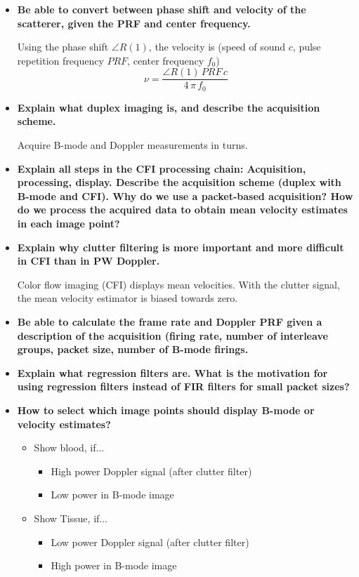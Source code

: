 \documentclass[10pt,a4paper,noendnumber=true]{scrartcl}
\begin{document}
\begin{itemize}
\item \textbf{Be able to convert between phase shift and velocity of the scatterer, given the PRF and center frequency.}

Using the phase shift $\angle R(1)$, the velocity is (speed of sound $c$, pulse repetition frequency $PRF$, center frequency $f_0$)
\begin{equation}
\nu = \frac{\angle R(1)\,PRF\,c}{4\,\pi\,f_0}
\end{equation}

\item \textbf{Explain what duplex imaging is, and describe the acquisition scheme.}

Acquire B-mode and Doppler measurements in turns.

\item \textbf{Explain all steps in the CFI processing chain: Acquisition, processing, display. Describe the acquisition scheme (duplex with B-mode and CFI). Why do we use a packet-based acquisition? How do we process the acquired data to obtain mean velocity estimates in each image point?}



\item \textbf{Explain why clutter filtering is more important and more difficult in CFI than in PW Doppler.}

Color flow imaging (CFI) displays mean velocities. With the clutter signal, the mean velocity estimator is biased towards zero.

\item \textbf{Be able to calculate the frame rate and Doppler PRF given a description of the acquisition (firing rate, number of interleave groups, packet size, number of B-mode firings.}



\item \textbf{Explain what regression filters are. What is the motivation for using regression filters instead of FIR filters for small packet sizes?}



\item \textbf{How to select which image points should display B-mode or velocity estimates?}

\begin{itemize}
\item Show blood, if...
\begin{itemize}
\item High power Doppler signal (after clutter filter)
\item Low power in B-mode image
\end{itemize}
\item Show Tissue, if...
\begin{itemize}
\item Low power Doppler signal (after clutter filter) %
\item High power in B-mode image
\end{itemize}
\end{itemize}


\end{itemize}
\end{document}
